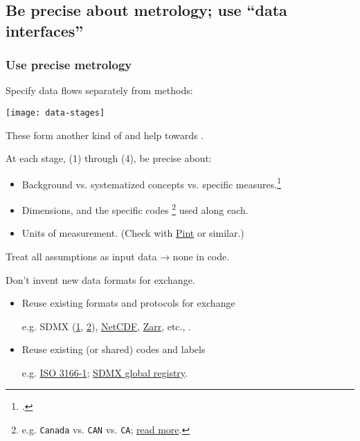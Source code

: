 \documentclass[12pt,aspectratio=169]{beamer}
\begin{document}
\subsection{Be precise about metrology; use “data interfaces”}
\begin{frame}[allowframebreaks]
\frametitle{Use precise metrology}

Specify data flows separately from methods:
\smallskip

\texttt{[image: data-stages]}

These form another kind of  and help towards .

\framebreak

At each stage, (1) through (4), be precise about:
\begin{itemize}
  \item Background vs. systematized concepts vs. specific measures.\footcite{adcock-collier-2001}
  \item Dimensions, and the specific codes%
    \footnote{e.g. \texttt{Canada} vs. \texttt{CAN} vs. \texttt{CA}; \href{https://paul.kishimoto.name/2021/01/handling-country-codes/}{read more}.}
    used along each.
  \item Units of measurement. (Check with \href{https://pint.readthedocs.io}{Pint} or similar.)
\end{itemize}

\medskip
Treat all assumptions as input data → none in code.

\medskip
Don't invent new data formats for exchange.
\begin{itemize}
  \item Reuse existing formats and protocols for exchange

    e.g. SDMX (\href{https://sdmx.org}{1}, \href{https://sdmx1.readthedocs.io/en/latest}{2}), \href{https://www.unidata.ucar.edu/software/netcdf/}{NetCDF}, \href{https://zarr.readthedocs.io/en/stable/}{Zarr}, etc., .
  \item Reuse existing (or shared) codes and labels

    e.g. \href{https://en.wikipedia.org/wiki/List_of_ISO_3166_country_codes}{ISO 3166-1}; \href{https://registry.sdmx.org/items/codelist.html}{SDMX global registry}.
\end{itemize}

\end{frame}
\end{document}
